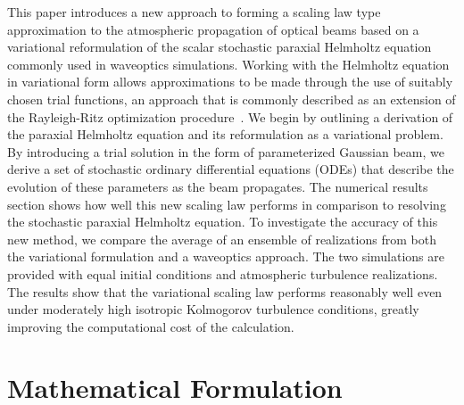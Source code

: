 \documentclass[9pt,twocolumn,twoside]{osajnl}
\begin{document}
This paper introduces a new approach to forming a scaling law type approximation to the 
atmospheric propagation of optical beams based on a variational reformulation of the scalar 
stochastic paraxial Helmholtz equation commonly used in waveoptics simulations.  
Working with the Helmholtz equation in variational form allows approximations to be made 
through the use of suitably chosen trial functions, an approach that is commonly described 
as an extension of the Rayleigh-Ritz optimization procedure~\cite{fox1987introduction}.  
We begin by outlining a derivation of the paraxial Helmholtz equation and its reformulation 
as a variational problem.  
By introducing a trial solution in the form of parameterized Gaussian beam, we derive a 
set of stochastic ordinary differential equations (ODEs) that describe the evolution of these 
parameters as the beam propagates.  
The numerical results section shows how well this new scaling law performs 
in comparison to resolving the stochastic paraxial Helmholtz equation.  
To investigate the accuracy of this new method, we compare the average of an ensemble of 
realizations from both the variational formulation and a waveoptics approach. The two simulations 
are provided with equal initial conditions and atmospheric turbulence realizations. 
The results show that the variational scaling law performs reasonably 
well even under moderately high isotropic Kolmogorov turbulence conditions, 
greatly improving the computational cost of the calculation.



\vspace*{-3mm}
\section{Mathematical Formulation}
\end{document}
